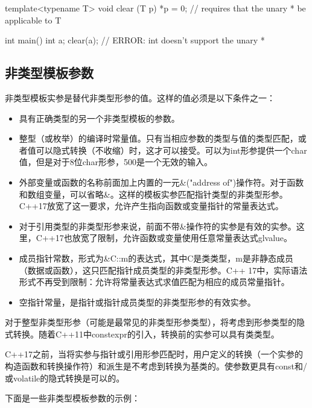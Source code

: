 \begin{cpp}
template<typename T>
void clear (T p)
{
	*p = 0; // requires that the unary * be applicable to T
}

int main()
{
	int a;
	clear(a); // ERROR: int doesn't support the unary *
}
\end{cpp}

\subsection{非类型模板参数}

非类型模板实参是替代非类型形参的值。这样的值必须是以下条件之一：

\begin{itemize}
\item 
具有正确类型的另一个非类型模板的参数。

\item
整型（或枚举）的编译时常量值。只有当相应参数的类型与值的类型匹配，或者值可以隐式转换（不收缩）时，这才可以接受。可以为int形参提供一个char值，但是对于8位char形参，500是一个无效的输入。

\item 
外部变量或函数的名称前面加上内置的一元\&("address of")操作符。对于函数和数组变量，可以省略\&。这样的模板实参匹配指针类型的非类型形参。C++17放宽了这一要求，允许产生指向函数或变量指针的常量表达式。

\item 
对于引用类型的非类型形参来说，前面不带\&操作符的实参是有效的实参。这里，C++17也放宽了限制，允许函数或变量使用任意常量表达式glvalue。

\item 
成员指针常数，形式为\&C::m的表达式，其中C是类类型，m是非静态成员（数据或函数），这只匹配指针成员类型的非类型形参。C++ 17中，实际语法形式不再受到限制：允许将常量表达式求值匹配为相应的成员常量指针。

\item 
空指针常量，是指针或指针成员类型的非类型形参的有效实参。
\end{itemize}

对于整型非类型形参（可能是最常见的非类型形参类型），将考虑到形参类型的隐式转换。随着C++11中constexpr的引入，转换前的实参可以具有类类型。

C++17之前，当将实参与指针或引用形参匹配时，用户定义的转换（一个实参的构造函数和转换操作符）和派生是不考虑到转换为基类的。使参数更具有const和/或volatile的隐式转换是可以的。

下面是一些非类型模板参数的示例：

